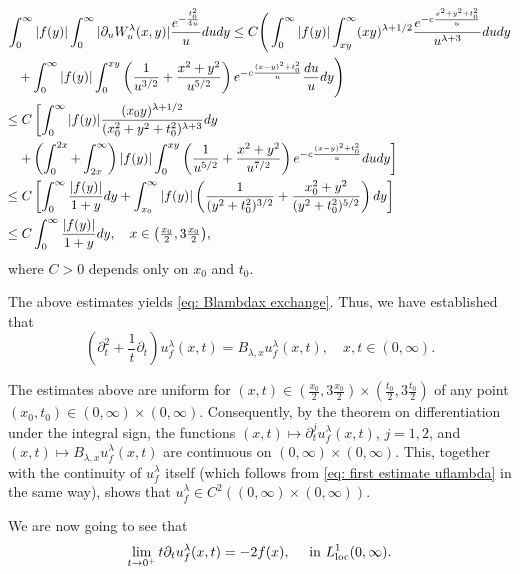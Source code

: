 \documentclass[a4paper,10pt, reqno]{amsart}
\theoremstyle{definition}
\theoremstyle{remark}
\numberwithin{equation}{section}
\begin{document}
\begin{align*}
    \int_0^ \infty |f(y)|\int_0^\infty |\partial_u W_u^\lambda (x,y)|\frac{e^{-\frac{t_0^2}{4u}}}{u}dudy&\leq C\Bigg(\int_0^\infty |f(y)|\int_{xy}^\infty (xy)^{\lambda+1/2}\frac{e^{-c\frac{x^2+y^2+t_0^2}{u}}}{u^{\lambda +3}}dudy\\
    &\hspace{-6cm}\quad +\int_0^\infty |f(y)|\int_0^{xy}\left(\frac{1}{u^{3/2}}+\frac{x^2+y^2}{u^{5/2}}\right)e^{-c\frac{(x-y)^2+t_0^2}{u}}\frac{du}{u}dy\Bigg)\\
    &\hspace{-6cm}\leq C\left[\int_0^\infty |f(y)|\frac{(x_0y)^{\lambda+1/2}}{(x_0^2+y^2+t_0^2)^{\lambda +3}}dy\right.\\
    &\hspace{-6cm}\left.\quad +\left(\int_0^{2x}+\int_{2x}^\infty\right)|f(y)|\int_0^{xy}\left(\frac{1}{u^{5/2}}+\frac{x^2+y^2}{u^{7/2}}\right)e^{-c\frac{(x-y)^2+t_0^2}{u}}dudy\right]\\
    &\hspace{-6cm}\leq C\left[\int_0^\infty \frac{|f(y)|}{1+y}dy+\int_{x_0}^\infty|f(y)|\left(\frac{1}{(y^2+t_0^2)^{3/2}}+\frac{x_0^2+y^2}{(y^2+t_0^2)^{5/2}}\right)dy\right]\\
    &\hspace{-6cm}\leq C\int_0^\infty \frac{|f(y)|}{1+y}dy,\quad x\in \big(\tfrac{x_0}{2},3\tfrac{x_0}{2}\big),
\end{align*}
where $C>0$ depends only on $x_0$ and $t_0$.

The above estimates yields \eqref{eq: Blambdax exchange}. Thus, we have established that
\[
\left(\partial_t^2+\frac{1}{t}\partial_t\right)u_f^\lambda (x,t)=B_{\lambda ,x}u_f^\lambda (x,t),\quad x,t\in (0,\infty).
\]

The estimates above are uniform for $(x,t)\in (\tfrac{x_0}{2},3\tfrac{x_0}{2})\times(\tfrac{t_0}{2},3\tfrac{t_0}{2})$ of any point $(x_0,t_0)\in(0,\infty)\times(0,\infty)$.
Consequently, by the theorem on differentiation under the integral sign, the functions
$(x,t)\mapsto \partial_t^ju_f^\lambda (x,t)$, $j=1,2$, and $(x,t)\mapsto B_{\lambda ,x}u_f^\lambda (x,t)$
are continuous on $(0,\infty)\times (0,\infty)$. This, together with the continuity of
$u_f^\lambda$ itself (which follows from \eqref{eq: first estimate uflambda} in the same way), shows that
$u_f^\lambda\in C^2((0,\infty)\times (0,\infty))$.

We are now going to see that
\[
\lim_{t\rightarrow 0^+}t\partial_t u_f^\lambda (x,t)=-2f(x),\quad \mbox{ in  }L^1_{\rm loc}(0,\infty).
\]
\end{document}
